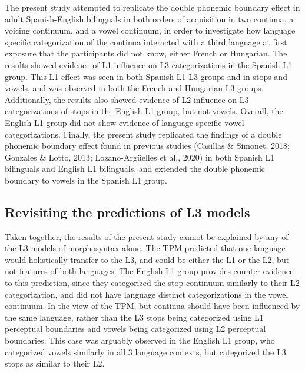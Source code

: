 \documentclass[
  man]{apa6}
\begin{document}
The present study attempted to replicate the double phonemic boundary effect in adult Spanish-English bilinguals in both orders of acquisition in two continua, a voicing continuum, and a vowel continuum, in order to investigate how language specific categorization of the continua interacted with a third language at first exposure that the participants did not know, either French or Hungarian. The results showed evidence of L1 influence on L3 categorizations in the Spanish L1 group. This L1 effect was seen in both Spanish L1 L3 groups and in stops and vowels, and was observed in both the French and Hungarian L3 groups. Additionally, the results also showed evidence of L2 influence on L3 categorizations of stops in the English L1 group, but not vowels. Overall, the English L1 group did not show evidence of language specific vowel categorizations. Finally, the present study replicated the findings of a double phonemic boundary effect found in previous studies (Casillas \& Simonet, 2018; Gonzales \& Lotto, 2013; Lozano-Argüelles et al., 2020) in both Spanish L1 bilinguals and English L1 bilinguals, and extended the double phonemic boundary to vowels in the Spanish L1 group.

\hypertarget{revisiting-the-predictions-of-l3-models}{%
\subsection{Revisiting the predictions of L3 models}\label{revisiting-the-predictions-of-l3-models}}

Taken together, the results of the present study cannot be explained by any of the L3 models of morphosyntax alone. The TPM predicted that one language would holistically transfer to the L3, and could be either the L1 or the L2, but not features of both languages.
The English L1 group provides counter-evidence to this prediction, since they categorized the stop continuum similarly to their L2 categorization, and did not have language distinct categorizations in the vowel continuum. In the view of the TPM, but continua should have been influenced by the same language, rather than the L3 stops being categorized using L1 perceptual boundaries and vowels being categorized using L2 perceptual boundaries. This case was arguably observed in the English L1 group, who categorized vowels similarly in all 3 language contexts, but categorized the L3 stops as similar to their L2.
\end{document}
